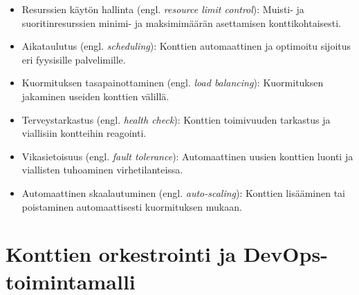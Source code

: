 \begin{itemize}
\item Resurssien käytön hallinta (engl. \textit{resource limit control}): Muisti- ja suoritinresurssien minimi- ja maksimimäärän asettamisen konttikohtaisesti.
\item Aikataulutus (engl. \textit{scheduling}): Konttien automaattinen ja optimoitu sijoitus eri fyysisille palvelimille.
\item Kuormituksen tasapainottaminen (engl. \textit{load balancing}): Kuormituksen jakaminen useiden konttien välillä. 
\item Terveystarkastus (engl. \textit{health check}): Konttien toimivuuden tarkastus ja viallisiin kontteihin reagointi.
\item Vikasietoisuus (engl. \textit{fault tolerance}): Automaattinen uusien konttien luonti ja viallisten tuhoaminen virhetilanteissa.
\item Automaattinen skaalautuminen (engl. \textit{auto-scaling}): Konttien lisääminen tai poistaminen automaattisesti kuormituksen mukaan.
\end{itemize}



\section{Konttien orkestrointi ja DevOps-toimintamalli}
